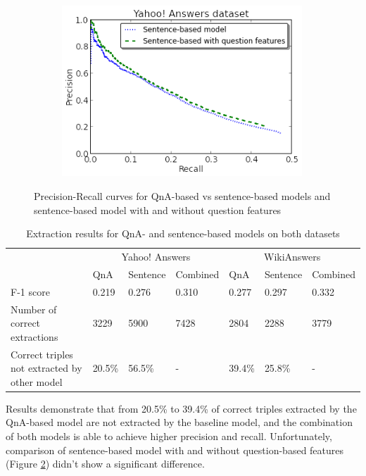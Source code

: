 \begin{figure}[h!]
\begin{subfigure}[h]{0.45\textwidth}
	\includegraphics[width=0.99\textwidth]{img/noqf_vs_qf}
	\vspace{-1mm}
	\label{figure:pr:noqf_vs_qf}
\end{subfigure}
\vspace{-1mm}
\caption{Precision-Recall curves for QnA-based vs sentence-based models and sentence-based model with and without question features}
\label{fig:qna_relextract:pr_curve}
\end{figure}

\begin{table}[tbh]
\centering
\caption{Extraction results for QnA- and sentence-based models on both datasets}
\vspace{-2mm}
\label{table:qna_relextract:results}
\begin{tabular}{|p{6.6cm}||p{0.9cm}|p{1.4cm}|p{1.6cm}||p{0.9cm}|p{1.4cm}|p{1.6cm}|}
\hline
& \multicolumn{3}{|c||}{Yahoo! Answers} & \multicolumn{3}{|c|}{WikiAnswers}\\
\cline{2-7}
& QnA & Sentence & Combined & QnA & Sentence & Combined\\
\hline
F-1 score & 0.219 & 0.276 & 0.310 & 0.277 & 0.297 & 0.332\\
Number of correct extractions & 3229 & 5900 & 7428 & 2804 & 2288 & 3779 \\
Correct triples not extracted by other model & 20.5\% & 56.5\% & - & 39.4\% & 25.8\% & - \\
\hline
\end{tabular}
\end{table}

Results demonstrate that from 20.5\% to 39.4\% of correct triples extracted by the QnA-based model are not extracted by the baseline model, and the combination of both models is able to achieve higher precision and recall.
Unfortunately, comparison of sentence-based model with and without question-based features (Figure \ref{fig:qna_relextract:pr_curve}) didn't show a significant difference.

